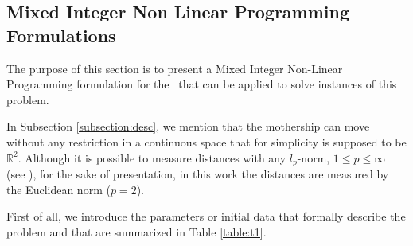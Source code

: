 \subsection{Mixed Integer Non Linear Programming Formulations}\label{Form}
The purpose of this section is to present a Mixed Integer Non-Linear Programming formulation for the \AMD \ that can be applied to solve instances of this problem.

In Subsection \ref{subsection:desc}, we mention that the mothership can move without any restriction in a continuous space that for simplicity is supposed to be $\mathbb R^2$. Although it is possible to measure distances with any $l_p$-norm, $1\leq p\leq \infty$ (see \cite{Blanco2017}), for the sake of presentation, in this work the distances are measured by the Euclidean norm ($p= 2$).

First of all, we introduce the parameters or initial data that formally describe the problem and that are summarized in Table \ref{table:t1}.

